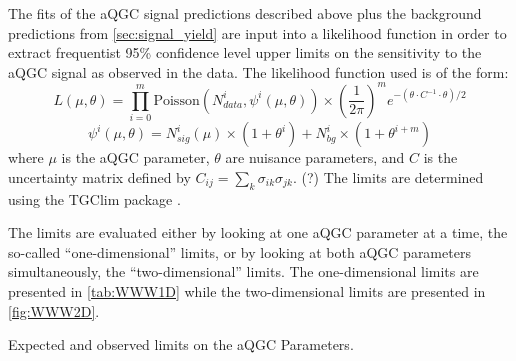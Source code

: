 The fits of the aQGC signal predictions described above plus the background predictions
from \sec\ref{sec:signal_yield} are input into a likelihood function
in order to extract frequentist 95\% confidence level upper limits on the 
sensitivity to the aQGC signal as observed in the data.
The likelihood function used is of the form:
\begin{equation}
 L(\mu,\theta) = \prod_{i=0}^m \text{Poisson}(N_{data}^i,\psi^i(\mu,\theta)) \times \left( \frac{1}{2\pi} \right)^m e^{-( \theta \cdot C^{-1} \cdot \theta)/2}
 \label{eq:likelihood}
\end{equation}
\begin{equation}
 \psi^i(\mu,\theta) = N^i_{sig}(\mu)\times(1+\theta^i) + N^i_{bg} \times(1+\theta^{i+m})
\end{equation}
 where $\mu$ is the aQGC parameter, $\theta$ are nuisance parameters, and $C$ is 
the uncertainty matrix defined by $C_{ij} = \sum_k \sigma_{ik} \sigma_{jk}$. (?)
The limits are determined using the TGClim package \cite{}.

The limits are evaluated either by looking at one aQGC 
parameter at a time, the so-called ``one-dimensional''
limits, or by looking at both aQGC parameters simultaneously, the 
``two-dimensional'' limits. The one-dimensional limits
are presented in \tab\ref{tab:WWW1D}
while the two-dimensional limits are presented in 
\fig\ref{fig:WWW2D}.
  
 
 \begin{table}
   \begin{center}
   
     \caption{Expected and observed limits on the aQGC Parameters.}
     \label{tab:WWW1D}

   \end{center}
 \end{table}
 
